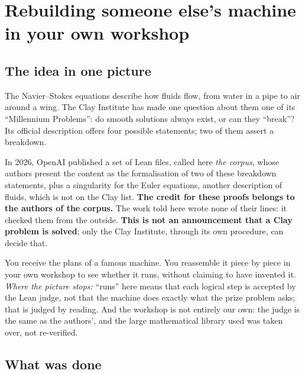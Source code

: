 \chapter[Rebuilding someone else's machine]{Rebuilding someone else's machine in your own workshop}


\section*{The idea in one picture}

The Navier--Stokes equations describe how fluids flow, from water in a pipe to air around a wing.
The Clay Institute has made one question about them one of its ``Millennium Problems'': do smooth
solutions always exist, or can they ``break''? Its official description offers four possible
statements; two of them assert a breakdown.

In 2026, OpenAI published a set of Lean files, called here \emph{the corpus}, whose authors
present the content as the formalisation of two of these breakdown statements, plus a singularity
for the Euler equations, another description of fluids, which is not on the Clay list.
\textbf{The credit for these proofs belongs to the authors of the corpus.} The work told here
wrote none of their lines: it checked them from the outside. \textbf{This is not an announcement
that a Clay problem is solved}; only the Clay Institute, through its own procedure, can decide
that.

\begin{analogie}
You receive the plans of a famous machine. You reassemble it piece by piece in your own workshop
to see whether it runs, without claiming to have invented it. \emph{Where the picture stops:}
``runs'' here means that each logical step is accepted by the Lean judge, not that the machine
does exactly what the prize problem asks; that is judged by reading. And the workshop is not
entirely our own: the judge is the same as the authors', and the large mathematical library used
was taken over, not re-verified.
\end{analogie}

\section*{What was done}

